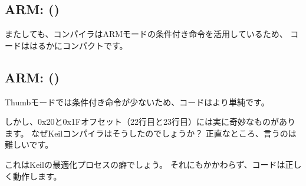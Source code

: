 \subsection{ARM: \OptimizingKeilVI (\ARMMode)}

またしても、コンパイラはARMモードの条件付き命令を活用しているため、
コードははるかにコンパクトです。



\subsection{ARM: \OptimizingKeilVI (\ThumbMode)}
\myindex{\CompilerAnomaly}
\label{Keil_anomaly}

Thumbモードでは条件付き命令が少ないため、コードはより単純です。

しかし、0x20と0x1Fオフセット（22行目と23行目）には実に奇妙なものがあります。
なぜKeilコンパイラはそうしたのでしょうか？
正直なところ、言うのは難しいです。

これはKeilの最適化プロセスの癖でしょう。
それにもかかわらず、コードは正しく動作します。


